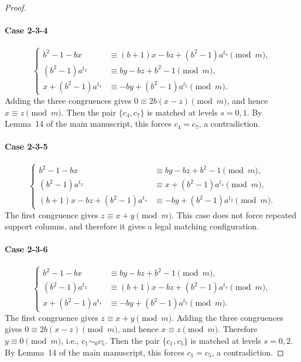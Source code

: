 \documentclass[11pt]{article}
\newcommand{\mymod}{\pmod{m}}
\begin{document}
\begin{proof}
\paragraph{Case 2-3-4}
$$
\begin{cases}
	b^2-1-bx &\equiv (b+1)x-bz+(b^2-1)a^{t_4}\mymod, \\
	(b^2-1)a^{t_2} &\equiv by-bz+b^2-1\mymod, \\
	  x+(b^2-1)a^{t_4}&\equiv -by+(b^2-1)a^{t_2}\mymod.
\end{cases}
$$
Adding the three congruences gives $0\equiv2b(x-z)\mymod$, and hence
$x\equiv z\mymod$. Then the pair 
$\{c_4,c_7\}$ is matched at levels $s=0,1$. By Lemma~14 of the main manuscript, this forces $c_4=c_7$, a
contradiction.

\paragraph{Case 2-3-5}
$$
\begin{cases}
	b^2-1-bx &\equiv by-bz+b^2-1\mymod, \\
	(b^2-1)a^{t_2} &\equiv x+(b^2-1)a^{t_4}\mymod, \\
	(b+1)x-bz+(b^2-1)a^{t_4} &\equiv -by+(b^2-1)a^{t_2}\mymod.
\end{cases}
$$
The first congruence gives $z\equiv x+y\mymod$. This case does not force repeated support columns, and therefore it gives a legal matching configuration.

\paragraph{Case 2-3-6}
$$
\begin{cases}
	b^2-1-bx &\equiv by-bz+b^2-1\mymod,\\
	(b^2-1)a^{t_2} &\equiv (b+1)x-bz+(b^2-1)a^{t_4}\mymod, \\
	   x+(b^2-1)a^{t_4}&\equiv -by+(b^2-1)a^{t_2}\mymod.
\end{cases}
$$
The first congruence gives $z\equiv x+y\mymod$. Adding the three congruences gives $0\equiv2b(x-z)\mymod$, and hence $x\equiv z\mymod$. Therefore $y\equiv0\mymod$, i.e., $c_1\sim_0 c_5$. Then the pair $\{c_1,c_5\}$ is matched at levels $s=0,2$. By Lemma~14 of the main manuscript, this forces $c_1=c_5$, a contradiction.


\end{proof}
\end{document}
